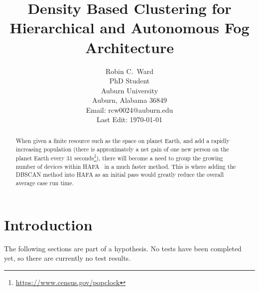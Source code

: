 \documentclass[letterpaper,twocolumn,10pt]{article}
\begin{document}



\title{\Large \bf Density Based Clustering for Hierarchical and Autonomous Fog Architecture}


\author{
{\rm Robin C.\ Ward}\\
PhD Student\\
Auburn University\\
Auburn, Alabama 36849\\
Email: rcw0024@auburn.edu\\
Last Edit: \today
} %

\maketitle

\begin{abstract}
When given a finite resource such as the space on planet Earth, and add a rapidly increasing population (there is approximately a net gain of one new person on the planet Earth every 31 seconds\footnote{\url{https://www.census.gov/popclock}}), there will become a need to group the growing number of devices within HAFA~\cite{10.1145/3229710.3229740} in a much faster method. This is where adding the DBSCAN method into HAFA as an initial pass would greatly reduce the overall average case run time.

\end{abstract}


\section{Introduction}

The following sections are part of a hypothesis. No tests have been completed yet, so there are currently no test results.
\end{document}
